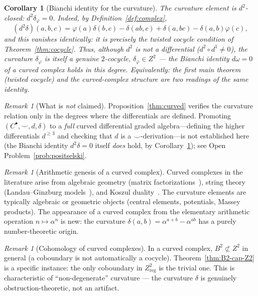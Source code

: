 \documentclass[11pt,a4paper]{article}
\theoremstyle{plain}
\newtheorem{corollary}[theorem]{Corollary}
\theoremstyle{definition}
\theoremstyle{remark}
\newtheorem{remark}[theorem]{Remark}
\begin{document}
\begin{corollary}[Bianchi identity for the curvature]
\label{cor:bianchi}
The curvature element is $d^2$-closed: $d^2\delta_\varphi = 0$. Indeed, by
Definition~\ref{def:complex},
\[
(d^2\delta)(a,b,c) = \varphi(a)\delta(b,c) - \delta(ab,c) + \delta(a,bc) - \delta(a,b)\varphi(c),
\]
and this vanishes identically: it is precisely the twisted cocycle condition of
Theorem~\ref{thm:cocycle}. Thus, although $d^2$ is not a differential
($d^2\circ d^1 \neq 0$), the curvature $\delta_\varphi$ is itself a genuine
$2$-cocycle, $\delta_\varphi \in Z^2$ --- the Bianchi identity $d\omega = 0$ of a
curved complex holds in this degree. Equivalently: the first main theorem
(twisted cocycle) and the curved-complex structure are two readings of the same
identity.
\end{corollary}

\begin{remark}[What is \emph{not} claimed]
\label{rem:not-claimed}
Proposition~\ref{thm:curved} verifies the curvature relation only in
the degrees where the differentials are defined. Promoting
$(C^\bullet, \smile, d, \delta)$ to a \emph{full} curved differential
graded algebra---defining the higher differentials $d^{\ge 3}$ and
checking that $d$ is a $\smile$-derivation---is not established here (the
Bianchi identity $d^2\delta = 0$ itself \emph{does} hold, by
Corollary~\ref{cor:bianchi}); see Open Problem~\ref{prob:positselski}.
\end{remark}

\begin{remark}[Arithmetic genesis of a curved complex]
\label{rem:genesis}
Curved complexes in the literature arise from algebraic geometry 
(matrix factorizations~\cite{Eisenbud1980}), string theory 
(Landau--Ginzburg models~\cite{Orlov2004}), and Koszul 
duality~\cite{Positselski2011}. The curvature elements are typically 
algebraic or geometric objects (central elements, potentials, Massey 
products). The appearance of a curved complex from the elementary 
arithmetic operation $n \mapsto \alpha^n$ is new: the curvature 
$\delta(a,b) = \alpha^{a+b} - \alpha^{ab}$ has a purely number-theoretic 
origin.
\end{remark}

\begin{remark}[Cohomology of curved complexes]
\label{rem:curved-cohomology}
In a curved complex, $B^2 \not\subset Z^2$ in general (a coboundary is 
not automatically a cocycle). Theorem~\ref{thm:B2-cap-Z2} is a specific 
instance: the only coboundary in $Z^2_{\mathrm{reg}}$ is the trivial 
one. This is characteristic of ``non-degenerate'' curvature --- the 
curvature $\delta$ is genuinely obstruction-theoretic, not an artifact.
\end{remark}
\end{document}
